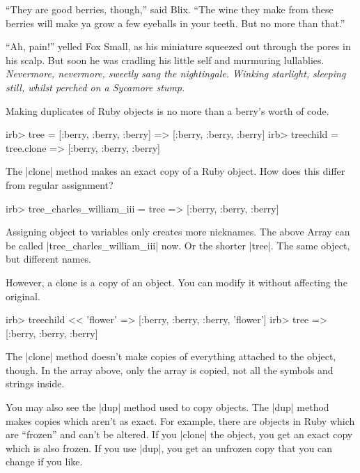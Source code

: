 \documentclass[12pt,twoside]{report}
\begin{document}
``They are good berries, though,'' said Blix.  ``The wine they make
from these berries will make ya grow a few eyeballs in your teeth.
But no more than that.''

``Ah, pain!'' yelled Fox Small, as his miniature squeezed out through
the pores in his scalp.  But soon he was cradling his little self and
murmuring lullablies.  {\em Nevermore, nevermore, sweetly sang the
  nightingale.  Winking starlight, sleeping still, whilst perched on a
  Sycamore stump.}

Making duplicates of Ruby objects is no more than a berry's worth of
code.


\begin{consolecode}

 irb> tree = [:berry, :berry, :berry]
   => [:berry, :berry, :berry]
 irb> treechild = tree.clone
   => [:berry, :berry, :berry]

\end{consolecode}


The \rubyinline|clone| method makes an exact copy of a
Ruby object.  How does this differ from regular assignment?


\begin{consolecode}

 irb> tree_charles_william_iii = tree
   => [:berry, :berry, :berry]

\end{consolecode}


Assigning object to variables only creates more nicknames.  The above
Array can be called
\rubyinline|tree_charles_william_iii| now.  Or the
shorter \rubyinline|tree|.  The same object, but
different names.

However, a clone is a copy of an object.  You can modify it without
affecting the original.


\begin{consolecode}

 irb> treechild << 'flower'
   => [:berry, :berry, :berry, 'flower']
 irb> tree
   => [:berry, :berry, :berry]

\end{consolecode}


The \rubyinline|clone| method doesn't make copies of
everything attached to the object, though.  In the array above, only
the array is copied, not all the symbols and strings inside.

You may also see the \rubyinline|dup| method used to
copy objects.  The \rubyinline|dup| method makes
copies which aren't as exact.  For example, there are objects in Ruby
which are ``frozen'' and can't be altered.  If you
\rubyinline|clone| the object, you get an exact copy
which is also frozen.  If you use \rubyinline|dup|,
you get an unfrozen copy that you can change if you like.
\end{document}
